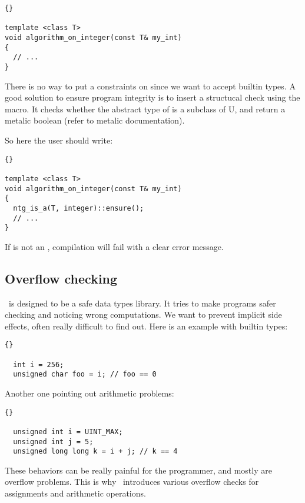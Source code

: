 \begin{lstlisting}{}

template <class T>
void algorithm_on_integer(const T& my_int)
{
  // ...
}

\end{lstlisting}

There is no way to put a constraints on  since we want to
accept builtin types. A good solution to ensure program integrity is
to insert a structucal check using the  macro. It
checks whether the abstract type of  is a subclass of U, and
return a metalic boolean (refer to metalic documentation). 

So here the user should write:

\begin{lstlisting}{}

template <class T>
void algorithm_on_integer(const T& my_int)
{
  ntg_is_a(T, integer)::ensure();
  // ...
}

\end{lstlisting}

If  is not an , compilation
will fail with a clear error message.

\subsection{Overflow checking}

\integre\ is designed to be a safe data types library. It tries to
make programs safer checking and noticing wrong computations. We want
to prevent implicit side effects, often really difficult to find
out. Here is an example with builtin types:

\begin{lstlisting}{}

  int i = 256;
  unsigned char foo = i; // foo == 0

\end{lstlisting}

Another one pointing out arithmetic problems:

\begin{lstlisting}{}

  unsigned int i = UINT_MAX;
  unsigned int j = 5;
  unsigned long long k = i + j; // k == 4

\end{lstlisting}

These behaviors can be really painful for the programmer, and mostly
are overflow problems. This is why \integre\ introduces various
overflow checks for assignments and arithmetic operations.

